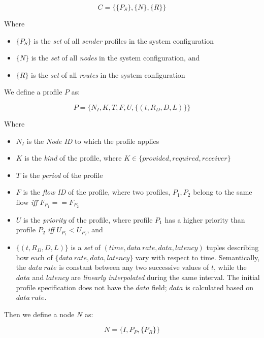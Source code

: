 \begin{equation}
  C = \{\{P_S\},\{N\},\{R\}\}
\end{equation}

Where

\begin{itemize}
\item $\{P_S\}$ is the \emph{set} of all \emph{sender} profiles in the system
  configuration
\item $\{N\}$ is the \emph{set} of all \emph{nodes} in the system configuration, and
\item $\{R\}$ is the \emph{set} of all \emph{routes} in the system configuration
\end{itemize}

We define a profile $P$ as:

\begin{equation}
  P = \{N_I,K,T,F,U,\{(t,R_D,D,L)\}\}
\end{equation}

Where

\begin{itemize}
\item $N_I$ is the \emph{Node ID} to which the profile applies
\item $K$ is the \emph{kind} of the profile, where
  $K\in\{provided,required,receiver\}$
\item $T$ is the \emph{period} of the profile
\item $F$ is the \emph{flow ID} of the profile, where two profiles,
  $P_1,P_2$ belong to the same flow \emph{iff}
  $F_{P_1}==F_{P_2}$
\item $U$ is the \emph{priority} of the profile, where profile
  $P_1$ has a higher priority than profile $P_2$ \emph{iff}
  $U_{P_1} < U_{P_2}$, and
\item $\{(t,R_D,D,L)\}$ is a \emph{set} of $(time, data\ rate,
  data, latency)$ tuples describing how each of $\{data\ rate,
  data, latency\}$ vary with respect to time.  Semantically, the
  $data\ rate$ is constant between any two successive values of
  $t$, while the $data$ and $latency$ are \emph{linearly
  interpolated} during the same interval.  The initial profile
  specification does not have the $data$ field; $data$ is
  calculated based on $data\ rate$.
\end{itemize}

Then we define a node $N$ as:

\begin{equation}
  N = \{I,P_P,\{P_R\}\}
\end{equation}

